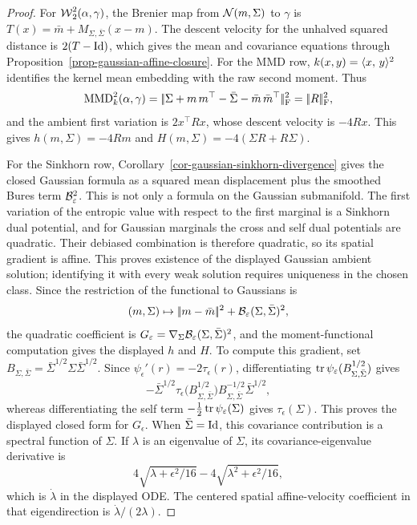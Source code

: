 \begin{proof}
	For \(\operatorname{\mathcal{W}}_2^2(\alpha,\gamma)\), the Brenier map from \(\mathcal{N}(m,\Sigma)\) to \(\gamma\) is
	\(T(x)=\bar m+M_{\Sigma,\bar\Sigma}(x-m)\).
	The descent velocity for the unhalved squared distance is \(2(T-\mathrm{Id})\), which gives the mean and covariance equations through Proposition~\ref{prop-gaussian-affine-closure}. For the MMD row, \(k(x,y)=\langle x,\,y\rangle^2\) identifies the kernel mean embedding with the raw second moment. Thus
	\[
		\operatorname{MMD}_k^2(\alpha,\gamma)
		=
		|\!| \Sigma+m\,m^\top-\bar\Sigma-\bar m\,\bar m^\top |\!|_{\mathrm F}^2
		=
		|\!| R |\!|_{\mathrm F}^2,
	\]
	and the ambient first variation is \(2x^\top R x\), whose descent velocity is \(-4Rx\). This gives \(h(m,\Sigma)=-4R m\) and \(H(m,\Sigma)=-4(\Sigma R+R\Sigma)\).

	For the Sinkhorn row, Corollary~\ref{cor-gaussian-sinkhorn-divergence} gives the closed Gaussian formula as a squared mean displacement plus the smoothed Bures term \(\mathcal{B}_\varepsilon^2\). This is not only a formula on the Gaussian submanifold. The first variation of the entropic value with respect to the first marginal is a Sinkhorn dual potential, and for Gaussian marginals the cross and self dual potentials are quadratic. Their debiased combination is therefore quadratic, so its spatial gradient is affine. This proves existence of the displayed Gaussian ambient solution; identifying it with every weak solution requires uniqueness in the chosen class. Since the restriction of the functional to Gaussians is
	\[
		(m,\Sigma)\mapsto |\!| m-\bar m |\!|^2+\mathcal{B}_\varepsilon(\Sigma,\bar\Sigma)^2,
	\]
	the quadratic coefficient is \(G_\varepsilon=\nabla_\Sigma\mathcal{B}_\varepsilon(\Sigma,\bar\Sigma)^2\), and the moment-functional computation gives the displayed \(h\) and \(H\). To compute this gradient, set \(B_{\Sigma,\bar\Sigma}=\bar\Sigma^{1/2}\Sigma\bar\Sigma^{1/2}\). Since \(\psi_\epsilon'(r)=-2\tau_\epsilon(r)\), differentiating
	\(\operatorname{tr}\psi_\varepsilon(B_{\Sigma,\bar\Sigma}^{1/2})\) gives
	\[
		-\bar\Sigma^{1/2}
		\tau_\epsilon\bigl(B_{\Sigma,\bar\Sigma}^{1/2}\bigr)
		B_{\Sigma,\bar\Sigma}^{-1/2}
		\bar\Sigma^{1/2},
	\]
	whereas differentiating the self term
	\(-\frac12\operatorname{tr}\psi_\varepsilon(\Sigma)\) gives \(\tau_\epsilon(\Sigma)\). This proves the displayed closed form for \(G_\epsilon\). When \(\bar\Sigma=\mathrm{Id}\), this covariance contribution is a spectral function of \(\Sigma\). If \(\lambda\) is an eigenvalue of \(\Sigma\), its covariance-eigenvalue derivative is
	\[
		4\sqrt{\lambda+\epsilon^2/16}-4\sqrt{\lambda^2+\epsilon^2/16},
	\]
			which is \(\dot\lambda\) in the displayed ODE. The centered spatial affine-velocity coefficient in that eigendirection is \(\dot\lambda/(2\lambda)\).


\end{proof}
